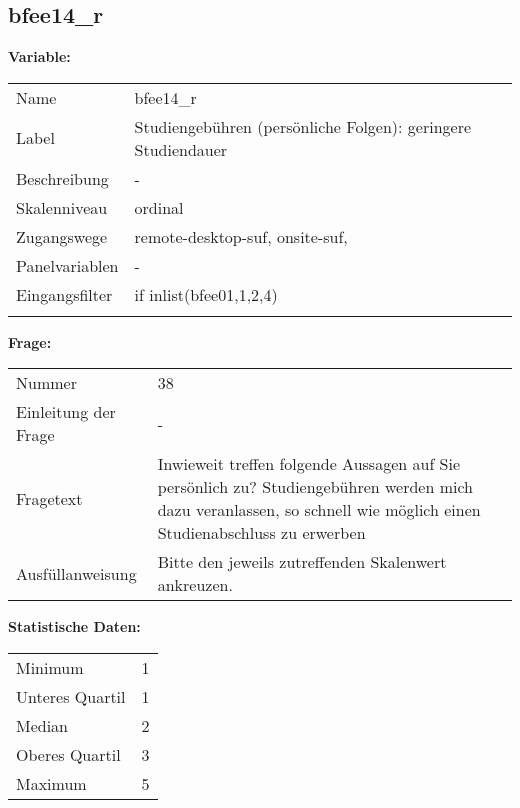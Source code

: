 	
	
	\subsection{bfee14\_r}
	\label{subSection:bfee14_r}

	\noindent\textbf{Variable:}\\
		\begin{tabular}{lL{11.3cm}}
			\label{tableVariable:bfee14_r}
			Name & bfee14\_r \\
			Label & Studiengebühren (persönliche Folgen): geringere Studiendauer \\
			Beschreibung & - \\
			Skalenniveau & ordinal \\
			Zugangswege &
				remote-desktop-suf,
				onsite-suf,
 \\
			Panelvariablen & -
			 \\
			Eingangsfilter & if inlist(bfee01,1,2,4) \\
 \\
		\end{tabular}

		\vspace*{1 cm}
		\noindent\textbf{Frage:}\\
		\begin{tabular}{lL{11.3cm}}
			\label{tableQuestion:bfee14_r}
			Nummer & 38 \\
			Einleitung der Frage & - \\
			Fragetext & Inwieweit treffen folgende Aussagen auf Sie persönlich zu?
Studiengebühren werden mich dazu veranlassen, so schnell wie möglich einen Studienabschluss zu erwerben \\
			Ausfüllanweisung & Bitte den jeweils zutreffenden Skalenwert ankreuzen. \\
		\end{tabular}


		\vspace*{1 cm}
		\noindent\textbf{Statistische Daten:}\\
			\begin{tabular}{ll}
				\label{tableStatistics:bfee14_r}
					Minimum & 1 \\
					Unteres Quartil & 1 \\
					Median & 2 \\
					Oberes Quartil & 3 \\
					Maximum & 5 \\
			\end{tabular}



